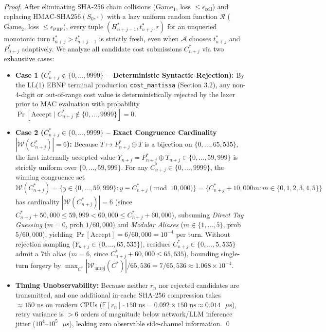\documentclass[9pt,a4paper]{extarticle}
\begin{document}
\emph{Proof.} After eliminating SHA-256 chain collisions ($\text{Game}_1$, loss $\le \epsilon_{\text{coll}}$) and replacing $\text{HMAC-SHA256}(S_0, \cdot)$ with a lazy uniform random function $\mathcal{R}$ ($\text{Game}_2$, loss $\le \epsilon_{\text{PRF}}$), every tuple $(H_{n+j-1}^*, t_{n+j}^*, r)$ for an unqueried monotonic turn $t_{n+j}^* > t_{n+j-1}^*$ is strictly fresh, even when $\mathcal{A}$ chooses $t_{n+j}^*$ and $P_{n+j}^*$ adaptively. We analyze all candidate cost submissions $C_{n+j}^*$ via two exhaustive cases:
\begin{itemize}
  \item \textbf{Case 1 ($C_{n+j}^* \notin \{0, \dots, 9999\}$ -- Deterministic Syntactic Rejection):} By the LL(1) EBNF terminal production \texttt{cost\_mantissa} (Section 3.2), any non-4-digit or out-of-range cost value is deterministically rejected by the lexer prior to MAC evaluation with probability $\Pr[\text{Accept} \mid C_{n+j}^* \notin \{0, \dots, 9999\}] = 0$.
  \item \textbf{Case 2 ($C_{n+j}^* \in \{0, \dots, 9999\}$ -- Exact Congruence Cardinality $|\mathcal{W}(C_{n+j}^*)| = 6$):} Because $T \mapsto P_{n+j}^* \oplus T$ is a bijection on $\{0, \dots, 65{,}535\}$, the first internally accepted value $Y_{n+j} = P_{n+j}^* \oplus T_{n+j} \in \{0, \dots, 59{,}999\}$ is strictly uniform over $\{0, \dots, 59{,}999\}$. For any $C_{n+j}^* \in \{0, \dots, 9999\}$, the winning congruence set $\mathcal{W}(C_{n+j}^*) = \{y \in \{0, \dots, 59{,}999\} : y \equiv C_{n+j}^* \pmod{10{,}000}\} = \{C_{n+j}^* + 10{,}000m : m \in \{0, 1, 2, 3, 4, 5\}\}$ has cardinality $|\mathcal{W}(C_{n+j}^*)| = 6$ (since $C_{n+j}^* + 50{,}000 \le 59{,}999 < 60{,}000 \le C_{n+j}^* + 60{,}000$), subsuming \emph{Direct Tag Guessing} ($m=0$, prob $1/60{,}000$) and \emph{Modular Aliases} ($m \in \{1,\dots,5\}$, prob $5/60{,}000$), yielding $\Pr[\text{Accept}] = 6/60{,}000 = 10^{-4}$ per turn. Without rejection sampling ($Y_{n+j} \in \{0, \dots, 65{,}535\}$), residues $C_{n+j}^* \in \{0, \dots, 5{,}535\}$ admit a 7th alias ($m=6$, since $C_{n+j}^* + 60{,}000 \le 65{,}535$), bounding single-turn forgery by $\max_{C^*} |\mathcal{W}_{\text{unrej}}(C^*)|/65{,}536 = 7/65{,}536 \approx 1.068 \times 10^{-4}$.
  \item \textbf{Timing Unobservability:} Because neither $r_n$ nor rejected candidates are transmitted, and one additional in-cache SHA-256 compression takes $\approx 150\text{ ns}$ on modern CPUs ($\mathbb{E}[r_n] \cdot 150\text{ ns} = 0.092 \times 150\text{ ns} \approx 0.014\text{ }\mu\text{s}$), retry variance is $>6$ orders of magnitude below network/LLM inference jitter ($10^4\text{--}10^5\text{ }\mu\text{s}$), leaking zero observable side-channel information. \qed
\end{itemize}
\end{document}
